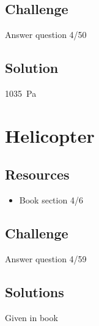 \subsection*{Challenge}
Answer question 4/50

\subsection*{Solution}
\SI{1035}{\pascal}




%
%
%
%
%
%
%



\newpage
\section{Helicopter}

\subsection*{Resources}
\begin{itemize}
    \item Book section 4/6
\end{itemize}

\subsection*{Challenge}
Answer question 4/59

\subsection*{Solutions}
Given in book
\fi
